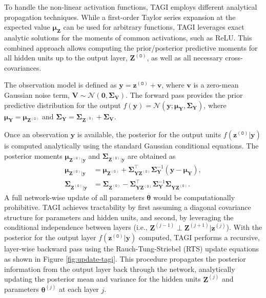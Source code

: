 \documentclass{uai2026} %
\begin{document}
To handle the non-linear activation functions, TAGI employs different analytical propagation techniques. While a first-order Taylor series expansion at the expected value $\bm{\mu}_{\bm{Z}}$ can be used for arbitrary functions, TAGI leverages exact analytic solutions for the moments of common activations, such as ReLU. This combined approach allows computing the prior/posterior predictive moments for all hidden units up to the output layer, $\bm{Z}^{(\mathtt{O})}$, as well as all necessary cross-covariances.

The observation model is defined as $\bm{y} = \bm{z}^{(\mathtt{O})} + \bm{v}$, where $\bm{v}$ is a zero-mean Gaussian noise term, $\bm{V} \sim \mathcal{N}(\bm{0}, \bm{\Sigma}_{\bm{V}})$. The forward pass provides the prior predictive distribution for the output $f(\bm{y}) = \mathcal{N}(\bm{y}; \bm{\mu}_{\bm{Y}}, \bm{\Sigma}_{\bm{Y}})$, where $\bm{\mu}_{\bm{Y}} = \bm{\mu}_{\bm{Z}^{(\mathtt{O})}}$ and $\bm{\Sigma}_{\bm{Y}} = \bm{\Sigma}_{\bm{Z}^{(\mathtt{O})}} + \bm{\Sigma}_{\bm{V}}$.

Once an observation $\bm{y}$ is available, the posterior for the output units $f(\bm{z}^{(\mathtt{O})}|\bm{y})$ is computed analytically using the standard Gaussian conditional equations. The posterior moments $\bm{\mu}_{\bm{Z}^{(\mathtt{O})}|\bm{y}}$ and $\bm{\Sigma}_{\bm{Z}^{(\mathtt{O})}|\bm{y}}$ are obtained as
\begin{equation}
\begin{aligned}
\bm{\mu}_{\bm{Z}^{(\mathtt{O})}|\bm{y}} &= \bm{\mu}_{\bm{Z}^{(\mathtt{O})}} + \bm{\Sigma}_{\bm{Y}\!\bm{Z}^{(\mathtt{O})}}^{\intercal}\bm{\Sigma}_{\bm{Y}}^{-1}(\bm{y}-\bm{\mu}_{\bm{Y}}), \\
\bm{\Sigma}_{\bm{Z}^{(\mathtt{O})}|\bm{y}} &= \bm{\Sigma}_{\bm{Z}^{(\mathtt{O})}} - \bm{\Sigma}_{\bm{Y}\!\bm{Z}^{(\mathtt{O})}}^{\intercal}\bm{\Sigma}_{\bm{Y}}^{-1}\bm{\Sigma}_{\bm{Y}\!\bm{Z}^{(\mathtt{O})}}.
\end{aligned}
\label{eq:gaussian_conditionals}
\end{equation}
A full network-wise update of all parameters $\bm{\theta}$ would be computationally prohibitive. TAGI achieves tractability by first assuming a diagonal covariance structure for parameters and hidden units, and second, by leveraging the conditional independence between layers (i.e., $\bm{Z}^{(j-1)} \perp \bm{Z}^{(j+1)} | \bm{z}^{(j)}$). With the posterior for the output layer $f(\bm{z}^{(\mathtt{O})}|\bm{y})$ computed, TAGI performs a recursive, layer-wise backward pass using the Rauch-Tung-Striebel (RTS) update equations \citep{rauch1965maximum} as shown in Figure \ref{fig:update-tagi}. This procedure propagates the posterior information from the output layer back through the network, analytically updating the posterior mean and variance for the hidden units $\bm{Z}^{(j)}$ and parameters $\bm{\theta}^{(j)}$ at each layer $j$. 
\end{document}
